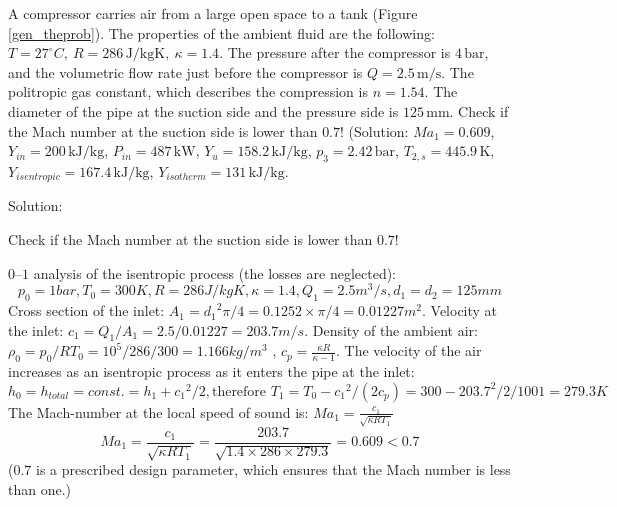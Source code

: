 \begin{tcolorbox}

A compressor carries air from a large open space to a tank (Figure \ref{gen_theprob}). The properties of the ambient fluid are the following: $T=27^{\circ}C,~ R=286\,\mathrm{J/kgK},~ \kappa=1.4$. The pressure after the compressor is $4\,\mathrm{bar}$, and the volumetric flow rate just before the compressor is $Q=2.5\,\mathrm{m/s}$. The politropic gas constant, which describes the compression  is $n=1.54$. The diameter of the pipe at the suction side and the pressure side is $125\,\mathrm{mm}$. Check if the Mach number at the suction side is lower than $0.7$!
(Solution: $Ma_1 = 0.609$, $Y_{in} = 200\,\mathrm{kJ/kg}$, $P_{in}=487\,\mathrm{kW}$, $Y_u = 158.2\,\mathrm{kJ/kg}$, $p_3=2.42\,\mathrm{bar}$, $T_{2,s}=445.9\,\mathrm{K}$, $Y_{isentropic} = 167.4\,\mathrm{kJ/kg}$, $Y_{isotherm}=131\,\mathrm{kJ/kg}$.
\vspace{0.2cm}


Solution:
\vspace{0.2cm}

Check if the Mach number at the suction side is lower than $0.7$!

$0$–$1$ analysis of the isentropic process (the losses are neglected):
\begin{equation*}
p_0=1 bar, T_0=300K, R=286J/kgK, \kappa=1.4, Q_1=2.5m^3/s, d_1=d_2=125mm
\end{equation*}
Cross section of the inlet: $A_1={d_1}^2\pi/4=0.1252\times\pi/4=0.01227 m^2$.
Velocity at the inlet: $c_1=Q_1/A_1=2.5/0.01227=203.7m/s$.
Density of the ambient air: $\rho_0=p_0/RT_0=10^5/286/300=1.166 kg/m^3$ , $c_p=\frac{\kappa R}{\kappa-1}$.
The velocity of the air increases as an isentropic process as it enters the pipe at the inlet:
\begin{equation*}
h_0=h_{total}=const.=h_1+{c_1}^2/2, \text{therefore } T_1=T_0-{c_1}^2/(2c_p)=300-203.7^2/2/1001=279.3 K
\end{equation*}
The Mach-number at the local speed of sound is: $Ma_1=\frac{c_1}{\sqrt{\kappa RT_1}}$
\begin{equation*}
Ma_1=\frac{c_1}{\sqrt{\kappa RT_1}}=\frac{203.7}{\sqrt{1.4 \times 286 \times 279.3}} = 0.609<0.7
\end{equation*}
($0.7$  is a prescribed design parameter, which ensures that the Mach number is less than one.)

\end{tcolorbox}
\vspace{1.5cm}

